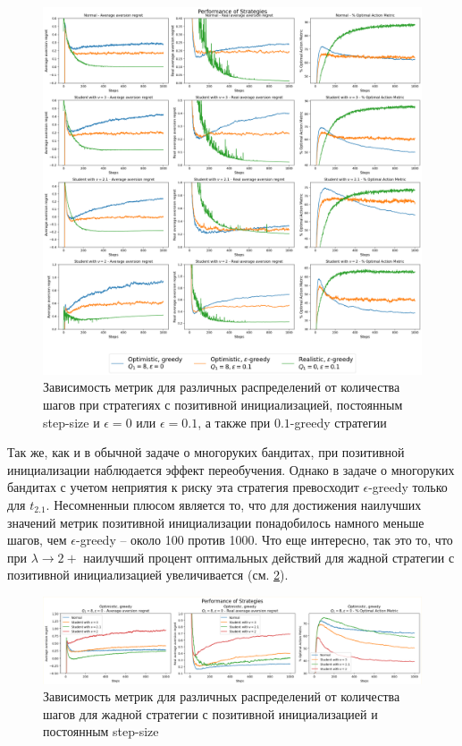 \documentclass{article}
\begin{document}
\begin{figure}[ht!] %
\centering
\includegraphics[width=6in]{theory_tester/theory_images/positive_init/one_distr.png}
\caption{Зависимость метрик для различных распределений от количества шагов при стратегиях с позитивной инициализацией, постоянным step-size и $\epsilon=0$ или $\epsilon=0.1$, а также при $0.1$-greedy стратегии}
\label{fig:positive_init_one_distr}
\end{figure}

Так же, как и в обычной задаче о многоруких бандитах, при позитивной инициализации наблюдается эффект переобучения. Однако в задаче о многоруких бандитах с учетом неприятия к риску эта стратегия превосходит $\epsilon$-greedy только для $t_{2.1}$. Несомненныи плюсом является то, что для достижения наилучших значений метрик позитивной инициализации понадобилось намного меньше шагов, чем $\epsilon$-greedy -- около 100 против 1000. Что еще интересно, так это то, что при $\lambda \to 2+$ наилучший процент оптимальных действий для жадной стратегии с позитивной инициализацией увеличивается (см. \ref{fig:positive_init_one_strat_positive_greedy}).

\begin{figure}[ht!] %
\centering
\includegraphics[width=6in]{theory_tester/theory_images/positive_init/one_strat_positive_greedy.png}
\caption{Зависимость метрик для различных распределений от количества шагов для жадной стратегии с позитивной инициализацией и постоянным step-size}
\label{fig:positive_init_one_strat_positive_greedy}
\end{figure}
\end{document}

